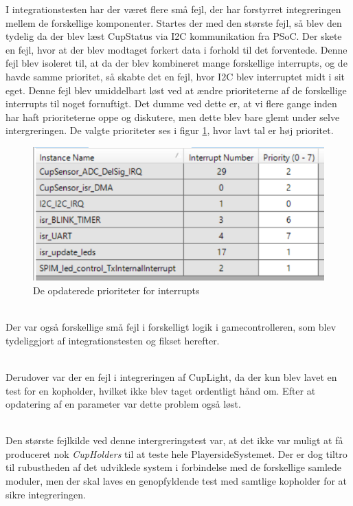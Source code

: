 \documentclass[Integrationstest/Integrationstest_main.tex]{subfiles}
\begin{document}
I integrationstesten har der været flere små fejl, der har forstyrret integreringen mellem de forskellige komponenter. Startes der med den største fejl, så blev den tydelig da der blev læst CupStatus via I2C kommunikation fra PSoC. Der skete en fejl, hvor at der blev modtaget forkert data i forhold til det forventede. Denne fejl blev isoleret til, at da der blev kombineret mange forskellige interrupts, og de havde samme prioritet, så skabte det en fejl, hvor I2C blev interruptet midt i sit eget. Denne fejl blev umiddelbart løst ved at ændre prioriteterne af de forskellige interrupts til noget fornuftigt. Det dumme ved dette er, at vi flere gange inden har haft prioriteterne oppe og diskutere, men dette blev bare glemt under selve intergreringen. De valgte prioriteter ses i figur \ref{fig:int_interrupt_priorities}, hvor lavt tal er høj prioritet.
\begin{figure}[H]
    \centering
    \includegraphics[width=\textwidth]{Integrationstest/Integrationstest_PlayerSide/graphics/CupSensorInt/Interrupts_prio.png}
    \caption{De opdaterede prioriteter for interrupts}
    \label{fig:int_interrupt_priorities}
\end{figure}

\\Der var også forskellige små fejl i forskelligt logik i gamecontrolleren, som blev tydeliggjort af integrationstesten og fikset herefter.

\\Derudover var der en fejl i integreringen af CupLight, da der kun blev lavet en test for en kopholder, hvilket ikke blev taget ordentligt hånd om. Efter at opdatering af en parameter var dette problem også løst.

\\Den største fejlkilde ved denne intergreringstest var, at det ikke var muligt at få produceret nok \textit{CupHolders} til at teste hele PlayersideSystemet. Der er dog tiltro til rubustheden af det udviklede system i forbindelse med de forskellige samlede moduler, men der skal laves en genopfyldende test med samtlige kopholder for at sikre integreringen. 
\end{document}
